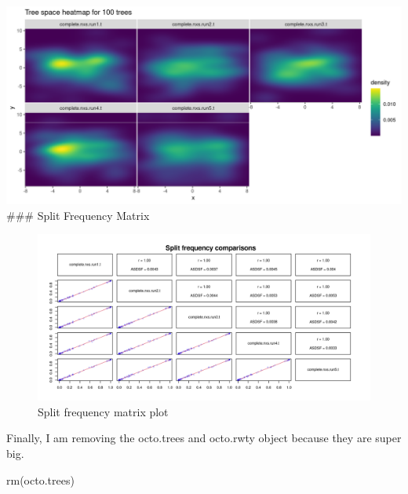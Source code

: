 \documentclass[
]{article}
\newenvironment{Shaded}{\begin{snugshade}}{\end{snugshade}}
\newcommand{\AttributeTok}[1]{\textcolor[rgb]{0.77,0.63,0.00}{#1}}
\newcommand{\DecValTok}[1]{\textcolor[rgb]{0.00,0.00,0.81}{#1}}
\newcommand{\FunctionTok}[1]{\textcolor[rgb]{0.00,0.00,0.00}{#1}}
\newcommand{\NormalTok}[1]{#1}
\newcommand{\SpecialCharTok}[1]{\textcolor[rgb]{0.00,0.00,0.00}{#1}}
\newcommand{\StringTok}[1]{\textcolor[rgb]{0.31,0.60,0.02}{#1}}
\begin{document}
\includegraphics{treespace_heatmap.png} \#\#\# Split Frequency Matrix

\begin{Shaded}
\end{Shaded}

\begin{figure}
\centering
\includegraphics{split_freq_matrix.png}
\caption{Split frequency matrix plot}
\end{figure}

Finally, I am removing the octo.trees and octo.rwty object because they
are super big.

\begin{Shaded}
\begin{Highlighting}[]
\FunctionTok{rm}\NormalTok{(octo.trees)}
\end{Highlighting}
\end{Shaded}
\end{document}
